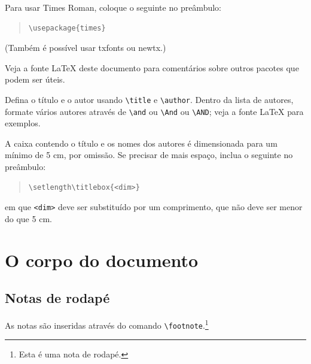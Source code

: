 \documentclass[11pt]{article}
\begin{document}
Para usar Times Roman, coloque o seguinte no preâmbulo:
\begin{quote}
\begin{verbatim}
\usepackage{times}
\end{verbatim}
\end{quote}
(Também é possível usar txfonts ou newtx.)

Veja a fonte \LaTeX{} deste documento para comentários sobre outros pacotes que podem ser úteis.

Defina o título e o autor usando \verb|\title| e \verb|\author|. Dentro da lista de autores, formate vários autores através de  \verb|\and| ou \verb|\And| ou \verb|\AND|; veja a fonte \LaTeX{} para exemplos.

A caixa contendo o título e os nomes dos autores é dimensionada para um mínimo de 5 cm, por omissão. Se precisar de mais espaço, inclua o seguinte no preâmbulo: 
\begin{quote}
\begin{verbatim}
\setlength\titlebox{<dim>}
\end{verbatim}
\end{quote}
em que \verb|<dim>| deve ser substituído por um comprimento, que não deve ser menor do que 5 cm.

\section{O corpo do documento}
\subsection{Notas de rodapé}
As notas são inseridas através do comando \verb|\footnote|.\footnote{Esta é uma nota de rodapé.}
\end{document}
